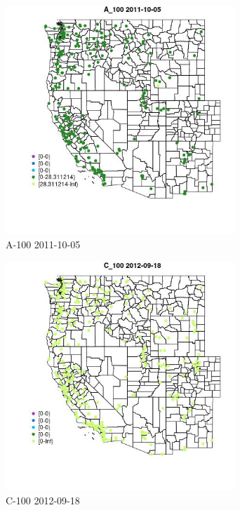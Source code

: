 \begin{figure} 
\centering  
\includegraphics[width=0.77\textwidth]{Code_Outputs/ML_input_report_ML_input_PM25_Step5_part_d_de_duplicated_aves_ML_input_MapObsA_1002011-10-05.jpg} 
\caption{\label{fig:ML_input_report_ML_input_PM25_Step5_part_d_de_duplicated_aves_ML_inputMapObsA_1002011-10-05}A-100 2011-10-05} 
\end{figure} 
 

\begin{figure} 
\centering  
\includegraphics[width=0.77\textwidth]{Code_Outputs/ML_input_report_ML_input_PM25_Step5_part_d_de_duplicated_aves_ML_input_MapObsC_1002012-09-18.jpg} 
\caption{\label{fig:ML_input_report_ML_input_PM25_Step5_part_d_de_duplicated_aves_ML_inputMapObsC_1002012-09-18}C-100 2012-09-18} 
\end{figure} 
 

